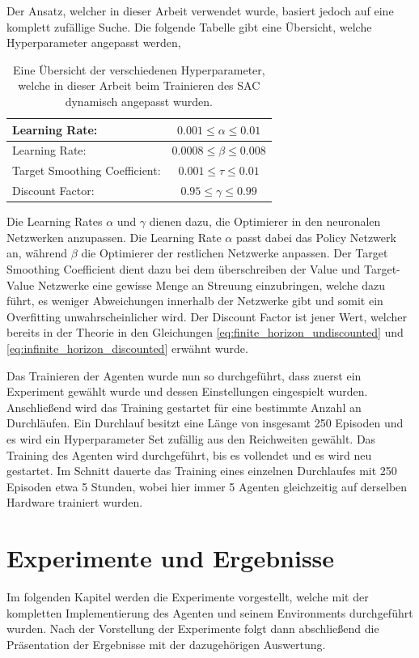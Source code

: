 \documentclass[]{iat}
\begin{document}
Der Ansatz, welcher in dieser Arbeit verwendet wurde, basiert jedoch auf eine komplett zufällige Suche. Die folgende Tabelle gibt eine Übersicht, welche Hyperparameter angepasst werden,
\begin{table}[H]
    \begin{tabular}{l|c}
        Learning Rate:                & $0.001 \leq \alpha \leq 0.01$  \\ \hline
        Learning Rate:                & $0.0008 \leq \beta \leq 0.008$ \\ \hline
        Target Smoothing Coefficient: & $0.001 \leq \tau \leq 0.01$    \\ \hline
        Discount Factor:              & $0.95 \leq \gamma \leq 0.99$
    \end{tabular}
    \caption{Eine Übersicht der verschiedenen Hyperparameter, welche in dieser Arbeit beim Trainieren des SAC dynamisch angepasst wurden.}
    \label{tab:hps}
\end{table}
Die Learning Rates $\alpha$ und $\gamma$ dienen dazu, die Optimierer in den neuronalen Netzwerken anzupassen. Die Learning Rate $\alpha$ passt dabei das Policy Netzwerk an, während $\beta$ die Optimierer der restlichen Netzwerke anpassen. Der Target Smoothing Coefficient dient dazu bei dem überschreiben der Value und Target-Value Netzwerke eine gewisse Menge an Streuung einzubringen, welche dazu führt, es weniger Abweichungen innerhalb der Netzwerke gibt und somit ein Overfitting unwahrscheinlicher wird. \cite[]{https://doi.org/10.48550/arxiv.1802.09477} Der Discount Factor ist jener Wert, welcher bereits in der Theorie in den Gleichungen \ref{eq:finite_horizon_undiscounted} und \ref{eq:infinite_horizon_discounted} erwähnt wurde.

Das Trainieren der Agenten wurde nun so durchgeführt, dass zuerst ein Experiment gewählt wurde und dessen Einstellungen eingespielt wurden. Anschließend wird das Training gestartet für eine bestimmte Anzahl an Durchläufen. Ein Durchlauf besitzt eine Länge von insgesamt 250 Episoden und es wird ein Hyperparameter Set zufällig aus den Reichweiten gewählt. Das Training des Agenten wird durchgeführt, bis es vollendet und es wird neu gestartet. Im Schnitt dauerte das Training eines einzelnen Durchlaufes mit 250 Episoden etwa 5 Stunden, wobei hier immer 5 Agenten gleichzeitig auf derselben Hardware trainiert wurden.

\chapter{Experimente und Ergebnisse} \label{sec:ergebnisse}
Im folgenden Kapitel werden die Experimente vorgestellt, welche mit der kompletten Implementierung des Agenten und seinem Environments durchgeführt wurden. Nach der Vorstellung der Experimente folgt dann abschließend die Präsentation der Ergebnisse mit der dazugehörigen Auswertung.
\end{document}
